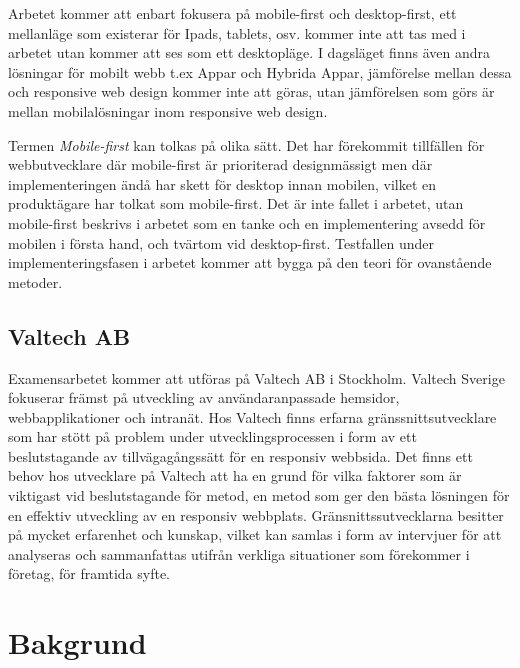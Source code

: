 \documentclass[11pt]{article}
\begin{document}
Arbetet kommer att enbart fokusera på mobile-first och desktop-first, ett mellanläge som existerar för Ipads, tablets, osv. kommer inte att tas med i arbetet utan kommer att ses som ett desktopläge. I dagsläget finns även andra lösningar för mobilt webb t.ex Appar och Hybrida Appar, jämförelse mellan dessa och responsive web design kommer inte att göras, utan jämförelsen som görs är mellan mobilalösningar inom responsive web design.

Termen \textit{Mobile-first} kan tolkas på olika sätt. Det har förekommit tillfällen för webbutvecklare där mobile-first är prioriterad designmässigt men där implementeringen ändå har skett för desktop innan mobilen, vilket en produktägare har tolkat som mobile-first. Det är inte fallet i arbetet, utan mobile-first beskrivs i arbetet som en tanke och en implementering avsedd för mobilen i första hand, och tvärtom vid desktop-first. Testfallen under implementeringsfasen i arbetet kommer att bygga på den teori för ovanstående metoder.


\subsection{Valtech AB}
Examensarbetet kommer att utföras på Valtech AB i Stockholm. Valtech Sverige fokuserar främst på utveckling av användaranpassade hemsidor, webbapplikationer och intranät. Hos Valtech finns erfarna gränssnittsutvecklare som har stött på problem under utvecklingsprocessen i form av ett beslutstagande av tillvägagångssätt för en responsiv webbsida. Det finns ett behov hos utvecklare på Valtech att ha en grund för vilka faktorer som är viktigast vid beslutstagande för metod, en metod som ger den bästa lösningen för en effektiv utveckling av en responsiv webbplats. Gränsnittssutvecklarna besitter på mycket erfarenhet och kunskap, vilket kan samlas i form av intervjuer för att analyseras och sammanfattas utifrån verkliga situationer som förekommer i företag, för framtida syfte.
\newpage


\section{Bakgrund}
\end{document}
